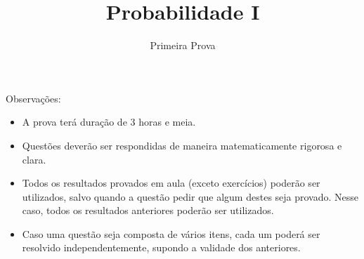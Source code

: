 \documentclass{article}
\newcommand*\1{\mathds{1}}
\begin{document}
\title{Probabilidade I}
\author{Primeira Prova}

\maketitle

\noindent Observa\c{c}\~oes:
\begin{itemize}
\item A prova terá duração de $3$ horas e meia.
\item Questões deverão ser respondidas de maneira matematicamente rigorosa e clara.
\item Todos os resultados provados em aula (exceto exercícios) poderão ser utilizados, salvo quando a questão pedir que algum destes seja provado. Nesse caso, todos os resultados anteriores poderão ser utilizados.
\item Caso uma questão seja composta de vários itens, cada um poderá ser resolvido independentemente, supondo a validade dos anteriores.
\end{itemize}

\vspace{4mm}


\vspace{4mm}

\vspace{4mm}
\end{document}
